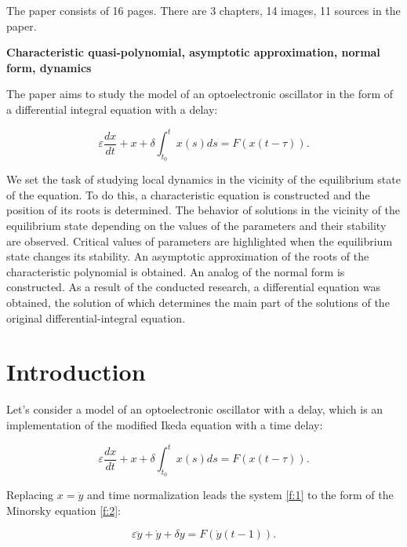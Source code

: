 \documentclass[12pt]{article} %
\newcommand{\eps}{\varepsilon}
\begin{document}
The paper consists of 16 pages. There are 3 chapters, 14 images, 11 sources in the paper.

\textbf{Characteristic quasi-polynomial, asymptotic approximation, normal form, dynamics}

The paper aims to study the model of an optoelectronic oscillator in the form of a differential integral equation with a delay:

\[
\varepsilon\frac{dx}{dt}+x+\delta\int^{t}_{t_{0}}x\left(s\right)ds=F\left(x(t-\tau)\right).
\]

\noindent We set the task of studying local dynamics in the vicinity of the equilibrium state of the equation. To do this, a characteristic equation is constructed and the position of its roots is determined. The behavior of solutions in the vicinity of the equilibrium state depending on the values of the parameters and their stability are observed. Critical values of parameters are highlighted when the equilibrium state changes its stability. An asymptotic approximation of the roots of the characteristic polynomial is obtained. An analog of the normal form is constructed. As a result of the conducted research, a differential equation was obtained, the solution of which determines the main part of the solutions of the original differential-integral equation.

\newpage 
\tableofcontents
\newpage

\section*{Introduction}

Let's consider a model of an optoelectronic oscillator with a delay, which is an implementation of the modified Ikeda equation \cite{S1} with a time delay:




\begin{equation}
\varepsilon\frac{dx}{dt}+x+\delta\int^{t}_{t_{0}}x\left(s\right)ds=F\left(x(t-\tau)\right). \label{f:1}
\end{equation}


\noindent Replacing $x =\dot{y}$   and time normalization leads the system \eqref{f:1} to the form of the Minorsky equation \cite{P1}\eqref{f:2}:

\begin{equation}
\eps\ddot{y}+\dot{y}+\delta y= F(\dot{y}(t-1)).
\label{f:2}
\end{equation}
\end{document}
